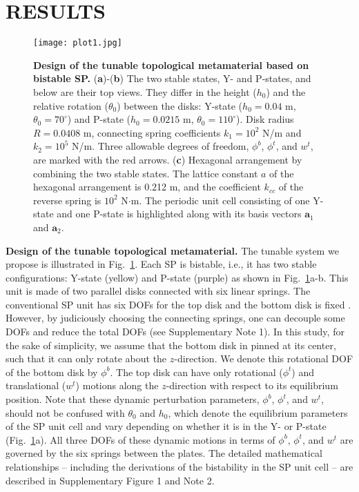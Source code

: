 \documentclass[aps,preprint,onecolumn,showpacs,superscriptaddress,groupedaddress]{revtex4}  %
\begin{document}
\section*{RESULTS}
\begin{figure}[t]
\centering
\texttt{[image: plot1.jpg]}
\caption{\textbf{Design of the tunable topological metamaterial based on bistable SP.} (\textbf{a})-(\textbf{b}) The two stable states, Y- and P-states, and below are their top views.  They differ in the height ($h_0$) and the relative rotation ($\theta_0$) between the disks: Y-state ($h_0 = 0.04$ m, $\theta_0= 70^{\circ}$) and P-state ($h_0 = 0.0215$ m, $\theta_0 = 110^{\circ}$). Disk radius $R = 0.0408$ m, connecting spring coefficients $k_1 = 10^2$ N/m and $k_2 = 10^5$ N/m. Three allowable degrees of freedom, $\phi^b$, $\phi^t$, and $w^t$, are marked with the red arrows. (\textbf{c}) Hexagonal arrangement by combining the two stable states. The lattice constant $a$ of the hexagonal arrangement is 0.212 m, and the coefficient $k_{cc}$ of the reverse spring is $10^2$ N$\cdot$m. The periodic unit cell consisting of one Y-state and one P-state is highlighted along with its basis vectors $\mathbf{a}_1$ and $\mathbf{a}_2$.
}
\label{fig1}
\end{figure} 

\textbf{Design of the tunable topological metamaterial.} The tunable system we propose is illustrated in Fig.~\ref{fig1}. Each SP is bistable, i.e., it has two stable configurations: Y-state (yellow) and P-state (purple) as shown in Fig.~\ref{fig1}a-b. This unit is made of two parallel disks connected with six linear springs. The conventional SP unit has six DOFs for the top disk and the bottom disk is fixed \citep{41}. However, by judiciously choosing the connecting springs, one can decouple some DOFs and reduce the total DOFs (see Supplementary Note 1). In this study, for the sake of simplicity, we assume that the bottom disk in pinned at its center, such that it can only rotate about the $z$-direction. We denote this rotational DOF of the bottom disk by $\phi^{b}$. The top disk can have only rotational ($\phi^t$) and translational ($w^t$) motions along the $z$-direction with respect to its equilibrium position. Note that these dynamic perturbation parameters, $\phi^{b}$, $\phi^t$, and $w^t$, should not be confused with $\theta_0$ and $h_0$, which denote the equilibrium parameters of the SP unit cell and vary depending on whether it is in the Y- or P-state (Fig.~\ref{fig1}a). All three DOFs of these dynamic motions in terms of $\phi^{b}$, $\phi^{t}$, and $w^{t}$ are governed by the six springs  between the plates. The detailed mathematical relationships -- including the derivations of the bistability in the SP unit cell -- are described in Supplementary Figure 1 and Note 2.
\end{document}

